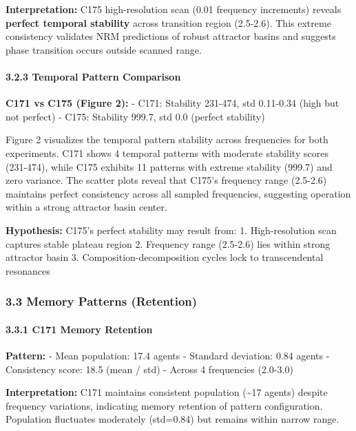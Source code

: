 \documentclass[
]{article}
\begin{document}
\textbf{Interpretation:} C175 high-resolution scan (0.01 frequency
increments) reveals \textbf{perfect temporal stability} across
transition region (2.5-2.6). This extreme consistency validates NRM
predictions of robust attractor basins and suggests phase transition
occurs outside scanned range.

\paragraph{3.2.3 Temporal Pattern
Comparison}\label{temporal-pattern-comparison}

\textbf{C171 vs C175 (Figure 2):} - C171: Stability 231-474, std
0.11-0.34 (high but not perfect) - C175: Stability 999.7, std 0.0
(perfect stability)

Figure 2 visualizes the temporal pattern stability across frequencies
for both experiments. C171 shows 4 temporal patterns with moderate
stability scores (231-474), while C175 exhibits 11 patterns with extreme
stability (999.7) and zero variance. The scatter plots reveal that
C175's frequency range (2.5-2.6) maintains perfect consistency across
all sampled frequencies, suggesting operation within a strong attractor
basin center.

\textbf{Hypothesis:} C175's perfect stability may result from: 1.
High-resolution scan captures stable plateau region 2. Frequency range
(2.5-2.6) lies within strong attractor basin 3.
Composition-decomposition cycles lock to transcendental resonances

\subsubsection{3.3 Memory Patterns
(Retention)}\label{memory-patterns-retention}

\paragraph{3.3.1 C171 Memory Retention}\label{c171-memory-retention}

\textbf{Pattern:} - Mean population: 17.4 agents - Standard deviation:
0.84 agents - Consistency score: 18.5 (mean / std) - Across 4
frequencies (2.0-3.0)

\textbf{Interpretation:} C171 maintains consistent population
(\textasciitilde17 agents) despite frequency variations, indicating
memory retention of pattern configuration. Population fluctuates
moderately (std=0.84) but remains within narrow range.
\end{document}
